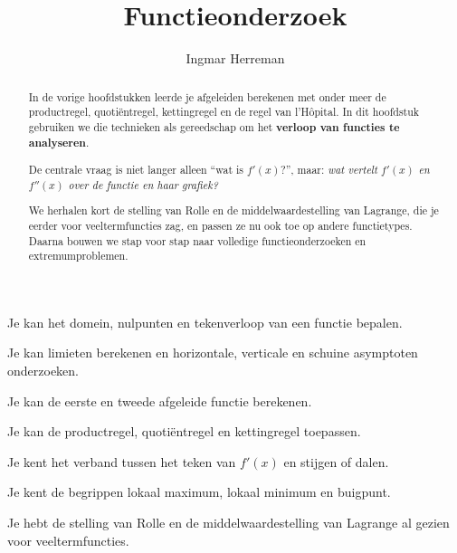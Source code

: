 \documentclass{ximera}
\title{Functieonderzoek}
\author{Ingmar Herreman}
\begin{document}





\begin{abstract}
In de vorige hoofdstukken leerde je afgeleiden berekenen met onder meer
de productregel, quotiëntregel, kettingregel en de regel van l'Hôpital.
In dit hoofdstuk gebruiken we die technieken als gereedschap om het
\textbf{verloop van functies te analyseren}.

De centrale vraag is niet langer alleen ``wat is \(f'(x)\)?'', maar:
\emph{wat vertelt \(f'(x)\) en \(f''(x)\) over de functie en haar grafiek?}

We herhalen kort de stelling van Rolle en de middelwaardestelling van
Lagrange, die je eerder voor veeltermfuncties zag, en passen ze nu ook toe
op andere functietypes. Daarna bouwen we stap voor stap naar volledige
functieonderzoeken en extremumproblemen.
\end{abstract}

\maketitle

\begin{voorkennis}
  \item Je kan het domein, nulpunten en tekenverloop van een functie bepalen.
  \item Je kan limieten berekenen en horizontale, verticale en schuine asymptoten onderzoeken.
  \item Je kan de eerste en tweede afgeleide functie berekenen.
  \item Je kan de productregel, quotiëntregel en kettingregel toepassen.
  \item Je kent het verband tussen het teken van \(f'(x)\) en stijgen of dalen.
  \item Je kent de begrippen lokaal maximum, lokaal minimum en buigpunt.
  \item Je hebt de stelling van Rolle en de middelwaardestelling van Lagrange al gezien voor veeltermfuncties.
\end{voorkennis}
\end{document}
